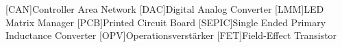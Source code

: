 
\begin{acronym}[ACRONYM]
[CAN]{Controller Area Network}
[DAC]{Digital Analog Converter}
[LMM]{LED Matrix Manager}
[PCB]{Printed Circuit Board}
[SEPIC]{Single Ended Primary Inductance Converter}
[OPV]{Operationsverstärker}
[FET]{Field-Effect Transistor}
\end{acronym}\newpage

